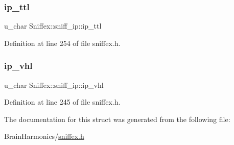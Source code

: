 \subsubsection{\texorpdfstring{ip\+\_\+ttl}{ip\_ttl}}
{\footnotesize\ttfamily u\+\_\+char Sniffex\+::sniff\+\_\+ip\+::ip\+\_\+ttl}



Definition at line 254 of file sniffex.\+h.

\mbox{\label{struct_sniffex_1_1sniff__ip_a64daddec106d5178ffbfe2f07378e438}} 
\subsubsection{\texorpdfstring{ip\+\_\+vhl}{ip\_vhl}}
{\footnotesize\ttfamily u\+\_\+char Sniffex\+::sniff\+\_\+ip\+::ip\+\_\+vhl}



Definition at line 245 of file sniffex.\+h.



The documentation for this struct was generated from the following file\+:\begin{DoxyCompactItemize}
\item 
Brain\+Harmonics/\hyperlink{sniffex_8h}{sniffex.\+h}\end{DoxyCompactItemize}
